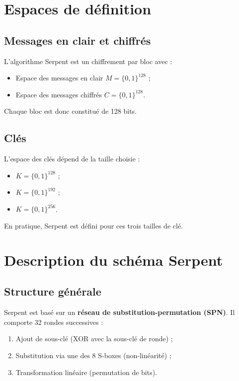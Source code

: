 \documentclass[12pt,a4paper]{report}
\begin{document}
\tableofcontents
\newpage

\chapter*{Espaces de définition}

\section{Messages en clair et chiffrés}
L’algorithme Serpent est un chiffrement par bloc avec :
\begin{itemize}
    \item Espace des messages en clair $M = \{0,1\}^{128}$ ;
    \item Espace des messages chiffrés $C = \{0,1\}^{128}$.
\end{itemize}
Chaque bloc est donc constitué de 128 bits.

\section{Clés}
L’espace des clés dépend de la taille choisie :
\begin{itemize}
    \item $K = \{0,1\}^{128}$ ;
    \item $K = \{0,1\}^{192}$ ;
    \item $K = \{0,1\}^{256}$.
\end{itemize}
En pratique, Serpent est défini pour ces trois tailles de clé.

\chapter*{Description du schéma Serpent}

\setcounter{section}{0}

\section{Structure générale}
Serpent est basé sur un \textbf{réseau de substitution-permutation (SPN)}.  
Il comporte 32 rondes successives :
\begin{enumerate}
    \item Ajout de sous-clé (XOR avec la sous-clé de ronde) ;
    \item Substitution via une des 8 S-boxes (non-linéarité) ;
    \item Transformation linéaire (permutation de bits).
\end{enumerate}
\end{document}
